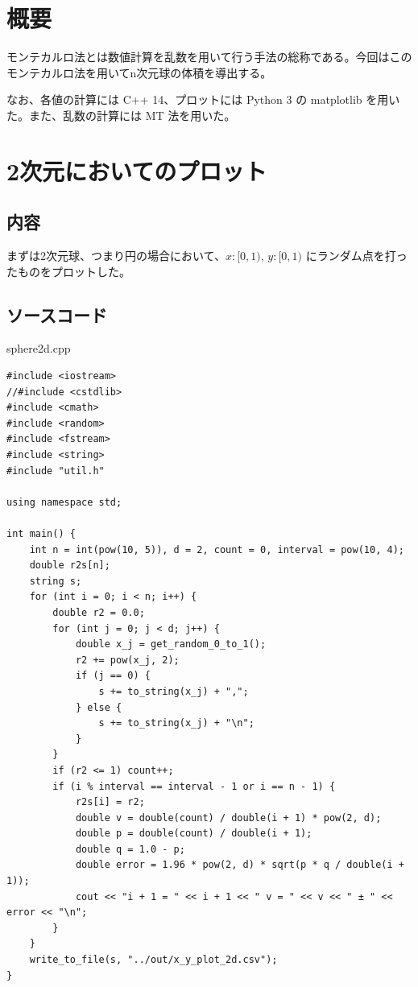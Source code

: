 \documentclass[a4paper,twoside]{jarticle}
\begin{document}

\maketitle

\section{概要}
モンテカルロ法とは数値計算を乱数を用いて行う手法の総称\cite{wiki-monte-carlo}である。今回はこのモンテカルロ法を用いてn次元球の体積を導出する。

なお、各値の計算には C++ 14、プロットには Python 3 の matplotlib を用いた。また、乱数の計算には MT 法を用いた。

\section{2次元においてのプロット}\label{s-2d}

\subsection{内容}
まずは2次元球、つまり円の場合において、$x: [0, 1)$, $y: [0, 1)$ にランダム点を打ったものをプロットした。

\subsection{ソースコード}

sphere2d.cpp
\begin{lstlisting}[]
#include <iostream>
//#include <cstdlib>
#include <cmath>
#include <random>
#include <fstream>
#include <string>
#include "util.h"

using namespace std;

int main() {
    int n = int(pow(10, 5)), d = 2, count = 0, interval = pow(10, 4);
    double r2s[n];
    string s;
    for (int i = 0; i < n; i++) {
        double r2 = 0.0;
        for (int j = 0; j < d; j++) {
            double x_j = get_random_0_to_1();
            r2 += pow(x_j, 2);
            if (j == 0) {
                s += to_string(x_j) + ",";
            } else {
                s += to_string(x_j) + "\n";
            }
        }
        if (r2 <= 1) count++;
        if (i % interval == interval - 1 or i == n - 1) {
            r2s[i] = r2;
            double v = double(count) / double(i + 1) * pow(2, d);
            double p = double(count) / double(i + 1);
            double q = 1.0 - p;
            double error = 1.96 * pow(2, d) * sqrt(p * q / double(i + 1));
            cout << "i + 1 = " << i + 1 << " v = " << v << " ± " << error << "\n";
        }
    }
    write_to_file(s, "../out/x_y_plot_2d.csv");
}
\end{lstlisting}
\end{document}
